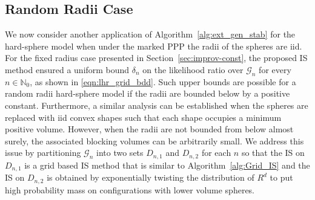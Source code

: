 \documentclass[11pt]{article}
\newcommand{\mbb}{\mathbb}
\begin{document}
\subsection{Random Radii Case}
\label{sec:improv-random}
We now consider another application of Algorithm~\ref{alg:ext_gen_stab} for the hard-sphere model {when under the marked PPP the radii of the spheres are iid.}
For the fixed radius case presented in Section~\ref{sec:improv-const}, the proposed IS method ensured a uniform bound $\delta_n$
on the likelihood ratio over ${\mathscr{G}}_n$ for every $n \in \mbb{N}_0$, as shown in \eqref{eqn:lhr_grid_bdd}. Such upper bounds are possible for a random radii hard-sphere model if the radii are bounded below by a positive constant. Furthermore, a similar analysis can be established when the spheres are replaced with iid convex shapes such that each shape occupies a minimum positive volume. However, when the radii are not bounded from below almost surely, the associated blocking volumes can be arbitrarily small.
We address this issue by partitioning ${\mathscr{G}}_n$ into two sets $D_{n,1}$ and $ D_{n,2}$ for each $n$ so that the IS on $D_{n,1}$ is a grid based IS method that is similar to Algorithm~\ref{alg:Grid_IS} and the IS on $D_{n,2}$ is obtained by {exponentially twisting the distribution of $R^d$ to put high probability mass on configurations with lower volume spheres.}\\
\end{document}
